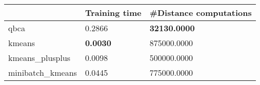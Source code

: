 \begin{table}[htbp]
\centering
\begin{tabular}{lll}
\toprule
 & Training time & #Distance computations \\
\midrule
qbca & 0.2866 & \textbf{32130.0000} \\
kmeans & \textbf{0.0030} & 875000.0000 \\
kmeans_plusplus & 0.0098 & 500000.0000 \\
minibatch_kmeans & 0.0445 & 775000.0000 \\
\bottomrule
\end{tabular}
\end{table}
